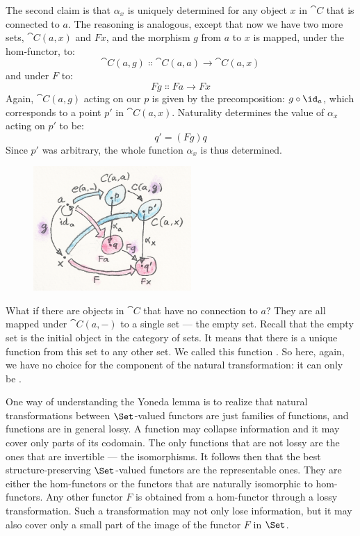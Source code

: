 The second claim is that $\alpha_x$ is uniquely determined for any
object $x$ in $\cat{C}$ that is connected to $a$. The
reasoning is analogous, except that now we have two more sets,
$\cat{C}(a, x)$ and $F x$, and the morphism $g$ from
$a$ to $x$ is mapped, under the hom-functor, to:
\[\cat{C}(a, g) \Colon \cat{C}(a, a) \to \cat{C}(a, x)\]
and under $F$ to:
\[F g \Colon F a \to F x\]
Again, $\cat{C}(a, g)$ acting on our $p$ is given by the
precomposition: $g \circ \id_a$, which corresponds to a point
$p'$ in $\cat{C}(a, x)$. Naturality determines the value
of $\alpha_x$ acting on $p'$ to be:
\[q' = (F g) q\]
Since $p'$ was arbitrary, the whole function $\alpha_x$ is
thus determined.

\begin{figure}[H]
\centering
\includegraphics[width=60mm]{images/yoneda5.png}
\end{figure}

\noindent
What if there are objects in $\cat{C}$ that have no connection to
$a$? They are all mapped under $\cat{C}(a, -)$ to a single set
--- the empty set. Recall that the empty set is the initial object in
the category of sets. It means that there is a unique function from this
set to any other set. We called this function . So here,
again, we have no choice for the component of the natural
transformation: it can only be .

One way of understanding the Yoneda lemma is to realize that natural
transformations between $\Set$-valued functors are just families
of functions, and functions are in general lossy. A function may
collapse information and it may cover only parts of its codomain. The
only functions that are not lossy are the ones that are invertible ---
the isomorphisms. It follows then that the best structure-preserving
$\Set$-valued functors are the representable ones. They are either
the hom-functors or the functors that are naturally isomorphic to
hom-functors. Any other functor $F$ is obtained from a
hom-functor through a lossy transformation. Such a transformation may
not only lose information, but it may also cover only a small part of
the image of the functor $F$ in $\Set$.

